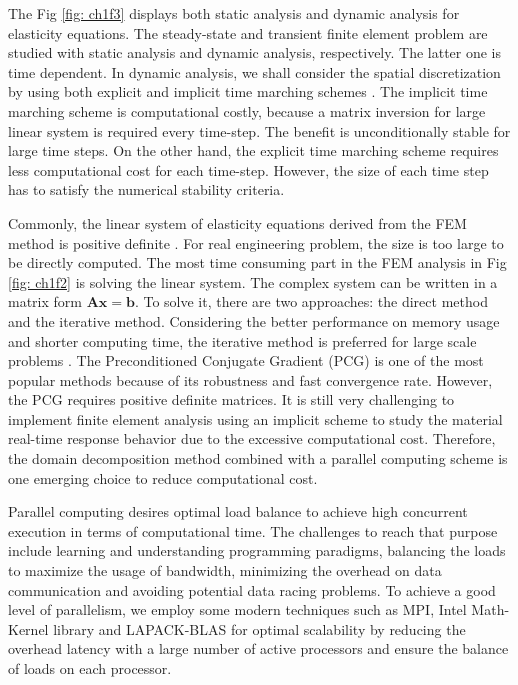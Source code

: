 The Fig \ref{fig: ch1f3} displays both static analysis and dynamic analysis for elasticity equations. The steady-state and transient finite element problem are studied with static analysis and dynamic analysis, respectively. The latter one is time dependent. In dynamic analysis, we shall consider the spatial discretization by using both explicit and implicit time marching schemes \cite{bathe2008finite}. The implicit time marching scheme is computational costly, because a matrix inversion for large linear system is required every time-step. The benefit is unconditionally stable for large time steps. On the other hand, the explicit time marching scheme requires less computational cost for each time-step. However, the size of each time step has to satisfy the numerical stability criteria. 


Commonly, the linear system of elasticity equations derived from the FEM method is positive definite . For real engineering problem, the size is too large to be directly computed. The most time consuming part in the FEM analysis in Fig \ref{fig: ch1f2} is solving the linear system. The complex system can be written in a matrix form $ \mathbf{A} \mathbf{x} = \mathbf{b} $. To solve it, there are two approaches: the direct method and the iterative method. Considering the better performance on memory usage and shorter computing time, the iterative method is preferred for large scale problems \cite{brussino1989comparison}. The Preconditioned Conjugate Gradient (PCG) is one of the most popular methods because of its robustness and fast convergence rate. However, the PCG requires positive definite matrices. It is still very challenging to implement finite element analysis using an implicit scheme to study the material real-time response behavior due to the excessive computational cost. Therefore, the domain decomposition method combined with a parallel computing scheme is one emerging choice to reduce computational cost.

Parallel computing desires optimal load balance to achieve high concurrent execution in terms of computational time. The challenges to reach that purpose include learning and understanding programming paradigms,  balancing the loads to maximize the usage of bandwidth, minimizing the overhead on data communication and avoiding potential data racing problems. To achieve a good level of parallelism, we employ some modern techniques such as MPI, Intel Math-Kernel library and LAPACK-BLAS for optimal scalability by reducing the overhead latency with a large number of active processors and ensure the balance of loads on each processor.

